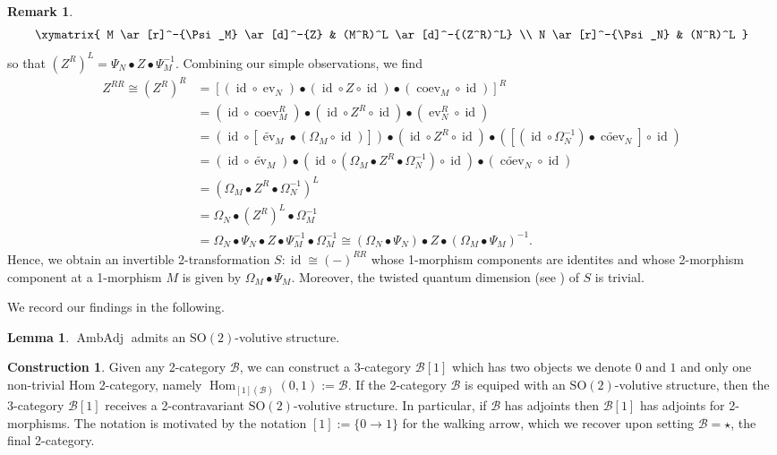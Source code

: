 \documentclass{article}
\newcommand{\id}{\operatorname{id}}%
\newcommand{\ev}{\operatorname{ev}}%
\newcommand{\coev}{\operatorname{coev}}%
\newcommand{\Hom}{\operatorname{Hom}}%
\newcommand{\AmAdj}{\operatorname{AmbAdj}}%
\newcommand{\Sotwo}{\operatorname{SO(2)}}
\newcommand{\B}{\mathcal{B}}
\numberwithin{equation}{section}
\theoremstyle{definition}
\newtheorem{construction}[definition]{Construction}
\newtheorem{lemma}[definition]{Lemma}
\newtheorem{remark}[definition]{Remark}
\theoremstyle{theorem}
\begin{document}
\begin{remark}
    \begin{equation}
        \begin{aligned}
        \xymatrix{
            M \ar[r]^-{\Psi_M} \ar[d]^-{Z} & (M^R)^L \ar[d]^-{(Z^R)^L} \\
            N \ar[r]^-{\Psi_N} & (N^R)^L
        }
        \end{aligned}
    \end{equation}
    so that $(Z^R)^L = \Psi_N \bullet Z \bullet \Psi^{-1}_M$. Combining our simple observations, we find 
    \begin{align*}
        Z^{RR} \cong (Z^R)^R &= [(\id \circ \ev_N) \bullet (\id \circ Z \circ \id) \bullet (\coev_M \circ \id)]^R \\
        &= (\id \circ \coev_M^R) \bullet (\id \circ Z^R \circ \id) \bullet (\ev_N^R  \circ \id)\\
        &= (\id \circ [\widetilde{\ev}_M \bullet (\Omega_M \circ \id)]) \bullet (\id \circ Z^R \circ \id) \bullet ([(\id \circ \Omega_N^{-1}) \bullet \widetilde{\coev}_N] \circ \id)\\
        &= (\id \circ \widetilde{\ev}_M) \bullet (\id \circ (\Omega_M \bullet Z^R \bullet \Omega_N^{-1}) \circ \id) \bullet  (\widetilde{\coev}_N \circ \id)\\
        &= (\Omega_M \bullet Z^R \bullet \Omega_N^{-1})^L \\
        &= \Omega_N \bullet (Z^R)^L \bullet \Omega_M^{-1} \\
        &= \Omega_N \bullet \Psi_N \bullet Z \bullet \Psi^{-1}_M \bullet \Omega_M^{-1} \cong (\Omega_N \bullet \Psi_N) \bullet Z \bullet (\Omega_M \bullet \Psi_M)^{-1}.
    \end{align*}
    Hence, we obtain an invertible 2-transformation $S \colon \id \cong (-)^{RR}$ whose 1-morphism components are identites and whose 2-morphism component at a 
    1-morphism $M$ is given by $\Omega_M \bullet \Psi_M$. Moreover, the twisted quantum dimension (see ) of $S$ is trivial. 
\end{remark}
We record our findings in the following.
\begin{lemma}\label{Lemma: Ambidextrous adjunction is volutive}
    $\AmAdj$ admits an $\Sotwo$-volutive structure.
\end{lemma}
\begin{construction}\label{From Sotwo volutive 2-categories to 3-categories}
    Given any 2-category $\B$, we can construct a 3-category $\B[1]$ which has two objects we denote $0$ and $1$ and only one non-trivial Hom 2-category, namely 
    $\Hom_{[1](\B)}(0,1) := \B$. If the 2-category $\B$ is equiped with an $\Sotwo$-volutive structure, then the 3-category 
    $\B[1]$ receives a 2-contravariant $\Sotwo$-volutive structure. In particular, if $\B$ has adjoints then $\B[1]$ has adjoints for 2-morphisms. 
    The notation is motivated by the notation $[1] := \{0 \rightarrow 1\}$ for the walking arrow, which we recover upon setting $\B = \star$, the final 2-category.
\end{construction}
\end{document}
